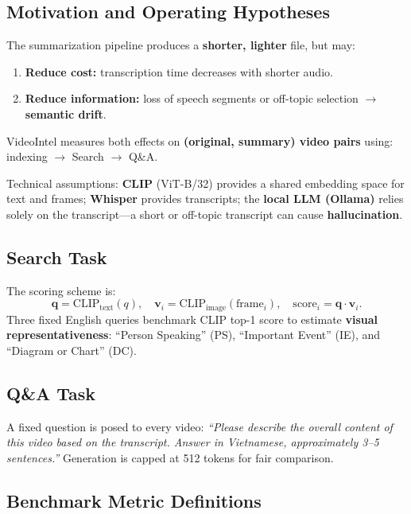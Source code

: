\documentclass[10pt,conference]{IEEEtran}
\begin{document}
\subsection{Motivation and Operating Hypotheses}

The summarization pipeline produces a \textbf{shorter, lighter} file, but may:
\begin{enumerate}
  \item \textbf{Reduce cost:} transcription time decreases with shorter audio.
  \item \textbf{Reduce information:} loss of speech segments or off-topic
        selection $\to$ \textbf{semantic drift}.
\end{enumerate}
VideoIntel measures both effects on \textbf{(original, summary) video pairs}
using: indexing $\to$ Search $\to$ Q\&A.

Technical assumptions: \textbf{CLIP} (ViT-B/32) provides a shared embedding
space for text and frames; \textbf{Whisper} provides transcripts; the
\textbf{local LLM (Ollama)} relies solely on the transcript---a short or
off-topic transcript can cause \textbf{hallucination}.

\subsection{Search Task}

The scoring scheme is:
\begin{equation}
  \mathbf{q} = \mathrm{CLIP}_{\text{text}}(q),\quad
  \mathbf{v}_i = \mathrm{CLIP}_{\text{image}}(\text{frame}_i),\quad
  \mathrm{score}_i = \mathbf{q} \cdot \mathbf{v}_i.
\end{equation}
Three fixed English queries benchmark CLIP top-1 score to estimate
\textbf{visual representativeness}: ``Person Speaking'' (PS), ``Important
Event'' (IE), and ``Diagram or Chart'' (DC).

\subsection{Q\&A Task}

A fixed question is posed to every video: \textit{``Please describe the
overall content of this video based on the transcript. Answer in Vietnamese,
approximately 3--5 sentences.''} Generation is capped at 512 tokens for fair
comparison.

\subsection{Benchmark Metric Definitions}
\end{document}

